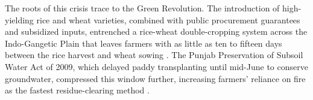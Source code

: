 \documentclass[12pt]{article}
\begin{document}
The roots of this crisis trace to the Green Revolution. The introduction of high-yielding rice and wheat varieties, combined with public procurement guarantees and subsidized inputs, entrenched a rice-wheat double-cropping system across the Indo-Gangetic Plain that leaves farmers with as little as ten to fifteen days between the rice harvest and wheat sowing \citep{kumar2015crop, bhuvaneshwari2019crop}. The Punjab Preservation of Subsoil Water Act of 2009, which delayed paddy transplanting until mid-June to conserve groundwater, compressed this window further, increasing farmers' reliance on fire as the fastest residue-clearing method \citep{maue2021climate, tripathi2016subsoilwater}. 
\end{document}
